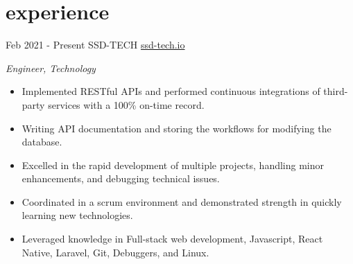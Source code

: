 \section*{experience}
\begin{entrylist}

	\entry
	{Feb 2021 - Present }
	{SSD-TECH}
	{\href{https://ssd-tech.io}{ssd-tech.io}}
	{\emph{Engineer, Technology}
		\begin{itemize}[topsep=6pt]
			\setlength\itemsep{0.40em}
			\item Implemented RESTful APIs and performed continuous integrations of third-party services with a 100\% on-time record.
			\item Writing API documentation and storing the workflows for modifying the database.
			\item Excelled in the rapid development of multiple projects, handling minor enhancements, and debugging technical issues.
			\item Coordinated in a scrum environment and demonstrated strength in quickly learning new technologies.
			\item Leveraged knowledge in Full-stack web development, Javascript, React Native, Laravel, Git, Debuggers, and Linux.
		\end{itemize}
	}

\end{entrylist}


